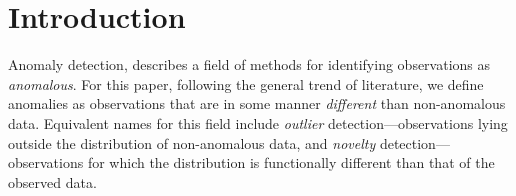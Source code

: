 \section{Introduction}



Anomaly detection, describes a field of methods for identifying observations as \emph{anomalous}.
    For this paper, following the general trend of literature, we define anomalies as observations
    that are in some manner \emph{different} than non-anomalous data.
    Equivalent names for this field include \emph{outlier} detection---observations lying outside the
    distribution of non-anomalous data, and \emph{novelty} detection---observations
    for which the distribution is functionally different than that of the observed data.








